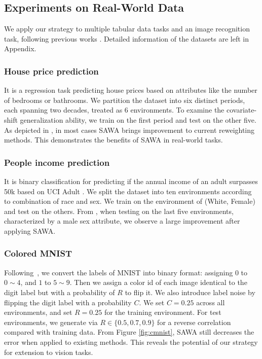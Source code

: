 \subsection{Experiments on Real-World Data}
\label{sec:real}

We apply our strategy to multiple tabular data tasks and an image recognition task, following previous works \citep{arjovsky2019invariant, shen2020stable, liu2021heterogeneous}. 
Detailed information of the datasets are left in Appendix. 

\subsubsection{House price prediction}
It is a regression task predicting house prices based on attributes like the number of bedrooms or bathrooms. 
We partition the dataset into six distinct periods, each spanning two decades, treated as 6 environments. To examine the covariate-shift generalization ability, we train on the first period and test on the other five. 
As depicted in , in most cases SAWA brings improvement to current reweighting methods. This demonstrates the benefits of SAWA in real-world tasks. 

\subsubsection{People income prediction}
\label{exp:adult}
It is binary classification for predicting if the annual income of an adult surpasses 50k based on UCI Adult \citep{kohavi1996scaling}. We split the dataset into ten environments according to combination of race and sex. We train on the environment of (White, Female) and test on the others. From , when testing on the last five environments, characterized by a male sex attribute, we observe a large improvement after applying SAWA. 

\subsubsection{Colored MNIST}
Following~\citet{arjovsky2019invariant}, we convert the labels of MNIST into binary format: assigning $0$ to $0\sim 4$, and $1$ to $5\sim 9$. Then we assign a color id of each image identical to the digit label but with a probability of $R$ to flip it. We also introduce label noise by flipping the digit label with a probability $C$. 
We set $C=0.25$ across all environments, and set $R=0.25$ for the training environment. For test environments, we generate via $R\in\{0.5,0.7,0.9\}$ for a reverse correlation compared with training data. From Figure \ref{fig:cmnist}, SAWA still decreases the error when applied to existing methods. 
This reveals the potential of our strategy for extension to vision tasks. 


